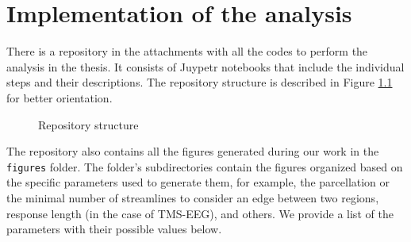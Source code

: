 \chapter{Implementation of the analysis}\label{appendix}

There is a repository in the attachments with all the codes to perform the analysis in the thesis. It consists of Juypetr notebooks that include the individual steps and their descriptions. The repository structure is described in Figure \ref{fig:repo-structure} for better orientation. 

\begin{figure}[!h]
\centering
\begin{minipage}{0.9\textwidth}
    \end{minipage}
    \caption{Repository structure}
    \label{fig:repo-structure}
\end{figure}

The repository also contains all the figures generated during our work in the \texttt{figures} folder. The folder's subdirectories contain the figures organized based on the specific parameters used to generate them, for example, the parcellation or the minimal number of streamlines to consider an edge between two regions, response length (in the case of TMS-EEG), and others. We provide a list of the parameters with their possible values below.

\newpage

